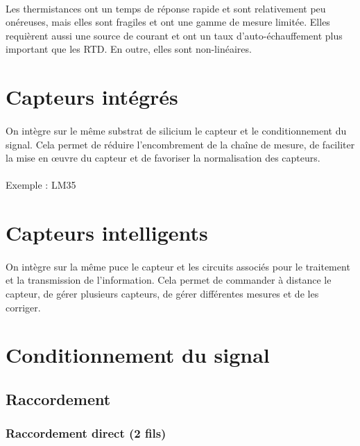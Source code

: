 \documentclass{article}
\begin{document}
\paragraph{}
Les thermistances ont un temps de réponse rapide et sont relativement peu onéreuses, mais elles sont fragiles et ont une gamme de mesure limitée. Elles requièrent aussi une source de courant et ont un taux d'auto-échauffement plus important que les RTD. En outre, elles sont non-linéaires.



\newpage
\section{Capteurs intégrés}
\paragraph{}
On intègre sur le même substrat de silicium le capteur et le conditionnement du signal. Cela permet de réduire l'encombrement de la chaîne de mesure, de faciliter la mise en \oe uvre du capteur et de favoriser la normalisation des capteurs.

\paragraph{}
Exemple : LM35

\newpage
\section{Capteurs intelligents}
\paragraph{}
On intègre sur la même puce le capteur et les circuits associés pour le traitement et la transmission de l'information. Cela permet de commander à distance le capteur, de gérer plusieurs capteurs, de gérer différentes mesures et de les corriger.

\newpage
\section{Conditionnement du signal}
\subsection{Raccordement}
\subsubsection{Raccordement direct (2 fils)}
\end{document}
